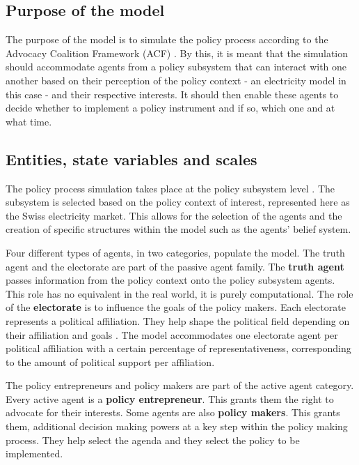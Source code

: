 \subsection{Purpose of the model}
\label{sec:purpose}

The purpose of the model is to simulate the policy process according to the Advocacy Coalition Framework (ACF) \citep{sabatier2007ACF}. By this, it is meant that the simulation should accommodate agents from a policy subsystem that can interact with one another based on their perception of the policy context - an electricity model in this case - and their respective interests. It should then enable these agents to decide whether to implement a policy instrument and if so, which one and at what time.


\subsection{Entities, state variables and scales}
\label{ssec:entities}

The policy process simulation takes place at the policy subsystem level \citep{sabatier2007ACF}. The subsystem is selected based on the policy context of interest, represented here as the Swiss electricity market. This allows for the selection of the agents and the creation of specific structures within the model such as the agents' belief system.

Four different types of agents, in two categories, populate the model. The truth agent and the electorate are part of the passive agent family. The {\bfseries truth agent} passes information from the policy context onto the policy subsystem agents. This role has no equivalent in the real world, it is purely computational. The role of the {\bfseries electorate} is to influence the goals of the policy makers. Each electorate represents a political affiliation. They help shape the political field depending on their affiliation and goals \citep{laver2011party}. The model accommodates one electorate agent per political affiliation with a certain percentage of representativeness, corresponding to the amount of political support per affiliation.

The policy entrepreneurs and policy makers are part of the active agent category. Every active agent is a  {\bfseries policy entrepreneur}. This grants them the right to advocate for their interests. Some agents are also {\bfseries policy makers}. This grants them, additional decision making powers at a key step within the policy making process. They help select the agenda and they select the policy to be implemented.

